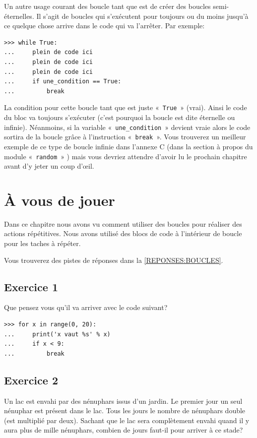 Un autre usage courant des boucle tant que est de créer des boucles semi-éternelles. 
Il s'agit de boucles qui s'exécutent pour toujours ou du moins jusqu'à ce quelque chose arrive dans le code qui va l'arrêter. Par exemple:

\begin{Verbatim}[frame=single,rulecolor=\color{gray}, label=ne pas saisir]
>>> while True:
...     plein de code ici
...     plein de code ici
...     plein de code ici
...     if une_condition == True:
...         break
\end{Verbatim}

La condition pour cette boucle tant que est juste «~\texttt{True}~» (vrai). Ainsi le code du bloc va toujours s'exécuter (c'est pourquoi la boucle est dite éternelle ou infinie). Néanmoins, si la variable «~\texttt{une\_condition}~»   devient vraie alors le code sortira de la boucle grâce à l'instruction «~\texttt{break}~». Vous trouverez un meilleur exemple de ce type de boucle infinie dans l'annexe C (dans la section à propos du module «~\texttt{random}~»  ) mais vous devriez attendre d'avoir lu le prochain chapitre avant d'y jeter un coup d'œil.

\section{À vous de jouer\label{PRATIQUE:BOUCLES}}
Dans ce chapitre nous avons vu comment utiliser des boucles pour réaliser des actions répétitives. Nous avons utilisé des blocs de code à l'intérieur de boucle pour les taches à répéter.


Vous trouverez des pistes de réponses dans la \autoref{REPONSES:BOUCLES}.
\subsection{Exercice 1}
Que pensez vous qu'il va arriver avec le code suivant?
\begin{Verbatim}[frame=single,rulecolor=\color{mbleu}, label=à taper]
>>> for x in range(0, 20):
... 	print('x vaut %s' % x)
... 	if x < 9:
... 		break
\end{Verbatim}

\subsection{Exercice 2}
Un lac est envahi par des nénuphars issus d'un jardin. Le premier jour un seul nénuphar est présent dans le lac.
Tous les jours le nombre de nénuphars double (est multiplié par deux). 
Sachant que le lac sera complètement envahi quand il y aura plus de mille nénuphars, combien de jours faut-il pour arriver à ce stade?

